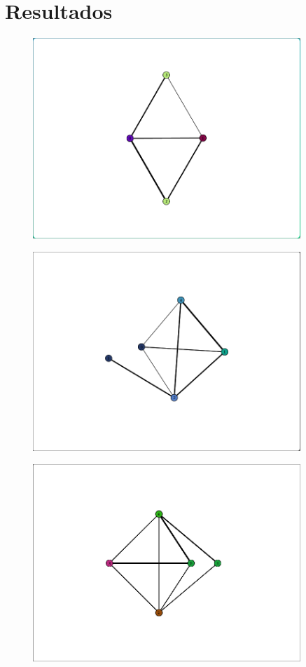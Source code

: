 \documentclass[
	12pt,				%
	oneside,			%
	a4paper,			%
	english,			%
	brazil,				%
	]{abntex2}
\begin{document}
{\section{Resultados}
\begin{figure}[H]
\centering
\includegraphics[width=0.9\textwidth]{imgs/img1.png}
\label{imagem 0.9}
\end{figure}
\begin{figure}[H]
\centering
\includegraphics[width=0.9\textwidth]{imgs/img2.png}
\label{imagem 2}
\end{figure}
\begin{figure}[H]
\centering
\includegraphics[width=0.9\textwidth]{imgs/img3.png}

\end{figure}}
\end{document}
